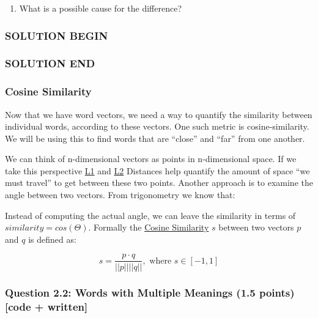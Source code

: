 \documentclass[11pt]{article}
\providecommand{\tightlist}{%
      \setlength{\itemsep}{0pt}\setlength{\parskip}{0pt}}
\begin{document}
\begin{enumerate}
    \def\labelenumi{\alph{enumi}.}
    \setcounter{enumi}{1}
    \tightlist
    \item
          What is a possible cause for the difference?
\end{enumerate}

\subsubsection{SOLUTION BEGIN}\label{solution-begin}

\subsubsection{SOLUTION END}\label{solution-end}

\subsubsection{Cosine Similarity}\label{cosine-similarity}

Now that we have word vectors, we need a way to quantify the similarity
between individual words, according to these vectors. One such metric is
cosine-similarity. We will be using this to find words that are
``close'' and ``far'' from one another.

We can think of n-dimensional vectors as points in n-dimensional space.
If we take this perspective
\href{http://mathworld.wolfram.com/L1-Norm.html}{L1} and
\href{http://mathworld.wolfram.com/L2-Norm.html}{L2} Distances help
quantify the amount of space ``we must travel'' to get between these two
points. Another approach is to examine the angle between two vectors.
From trigonometry we know that:

Instead of computing the actual angle, we can leave the similarity in
terms of \(similarity = cos(\Theta)\). Formally the
\href{https://en.wikipedia.org/wiki/Cosine_similarity}{Cosine
    Similarity} \(s\) between two vectors \(p\) and \(q\) is defined as:

\[s = \frac{p \cdot q}{||p|| ||q||}, \textrm{ where } s \in [-1, 1] \]

\subsubsection{Question 2.2: Words with Multiple Meanings (1.5 points)
{[}code +
written{]}}\label{question-2.2-words-with-multiple-meanings-1.5-points-code-written}
\end{document}
